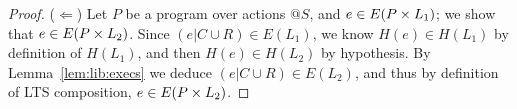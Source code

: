 \begin{proof}
  ($\Leftarrow$)
  Let $P$ be a program over actions $@S$, and $e \in E(P \times L_1)$; we show that
  $e \in E(P \times L_2)$. Since $(e | C \cup R) \in E(L_1)$, we know $H(e) \in
  H(L_1)$ by definition of $H(L_1)$, and then $H(e) \in H(L_2)$ by hypothesis.
  By Lemma~\ref{lem:lib:execs} we deduce $(e | C \cup R) \in E(L_2)$, and
  thus by definition of LTS composition, $e \in E(P \times L_2)$.

\end{proof}
